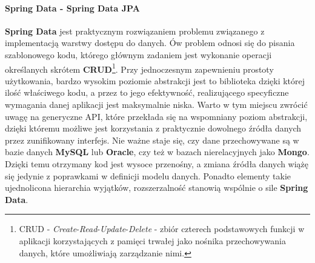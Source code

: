 	\paragraph{Spring Data - Spring Data JPA}\label{app:spring_data}
	\textbf{Spring Data} jest praktycznym rozwiązaniem problemu związanego z implementacją warstwy dostępu do danych. Ów problem odnosi się do pisania szablonowego kodu, którego głównym zadaniem jest wykonanie operacji określanych skrótem \textbf{CRUD}\footnote{CRUD - \textit{Create}-\textit{Read}-\textit{Update}-\textit{Delete} - zbiór czterech podstawowych funkcji w aplikacji korzystających z pamięci trwałej jako nośnika przechowywania danych, które umożliwiają zarządzanie nimi.}. Przy jednoczesnym zapewnieniu prostoty użytkowania, bardzo wysokim poziomie abstrakcji jest to biblioteka dzięki której ilość właściwego kodu, a przez to jego efektywność, realizującego specyficzne wymagania danej aplikacji jest maksymalnie niska. Warto w tym miejscu zwrócić uwagę na generyczne API, które przekłada się na wspomniany poziom abstrakcji, dzięki któremu możliwe jest korzystania z praktycznie dowolnego źródła danych przez zunifikowany interfejs. Nie ważne staje się, czy dane przechowywane są w bazie danych \textbf{MySQL} lub \textbf{Oracle}, czy też w bazach nierelacyjnych jako \textbf{Mongo}. Dzięki temu otrzymany kod jest wysoce przenośny, a zmiana źródła danych wiążę się jedynie z poprawkami w definicji modelu danych. Ponadto elementy takie ujednolicona hierarchia wyjątków, rozszerzalność stanowią wspólnie o sile \textbf{Spring Data}.
	
